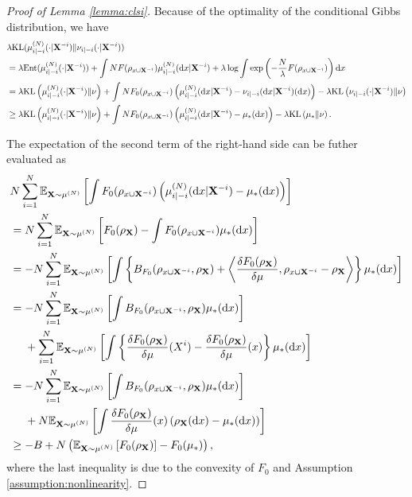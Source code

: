 \begin{proof}[Proof of Lemma \ref{lemma:clsi}]
    Because of the optimality of the conditional Gibbs distribution, we have 
    \begin{align}
        &\lambda\KL( \pow[\mu,N]_{i|-i}(\cdot|\vX^{-i}) \| \nu_{i|-i}(\cdot|\vX^{-i})) \notag\\
        &=\lambda \Ent(\pow[\mu,N]_{i|-i}(\cdot|\vX^{-i}))
        + \int NF(\rho_{x \cup \vX^{-i}}) \pow[\mu,N]_{i|-i}(\rd x|\vX^{-i})
        + \lambda \log \int \exp\left(-\frac{N}{\lambda}F(\rho_{x\cup \vX^{-i}})\right) \rd x \notag \\
        &=\lambda \KL\left(\pow[\mu,N]_{i|-i}(\cdot|\vX^{-i} )\| \nu \right)
        + \int NF_0(\rho_{x \cup \vX^{-i}}) \left(\pow[\mu,N]_{i|-i}(\rd x|\vX^{-i})
        - \nu_{i|-i}(\rd x|\vX^{-i})(\rd x)\right)  - \lambda \KL\left(\nu_{i|-i}(\cdot|\vX^{-i}) \| \nu\right) \notag \\
        &\geq \lambda \KL\left(\pow[\mu,N]_{i|-i}(\cdot|\vX^{-i} )\| \nu \right)
        + \int NF_0(\rho_{x \cup \vX^{-i}}) \left(\pow[\mu,N]_{i|-i}(\rd x|\vX^{-i})
        - \mu_*(\rd x)\right)  - \lambda \KL\left(\mu_* \| \nu\right). \label{eq:fisher_div_eval2}
    \end{align}

    The expectation of the second term of the right-hand side can be futher evaluated as 
    \begin{align}
        &N \sum_{i=1}^N \bE_{\vX \sim \pow[\mu,N]} \left[ \int F_0(\rho_{x \cup \vX^{-i}}) \left(\pow[\mu,N]_{i|-i}(\rd x|\vX^{-i})- \mu_*(\rd x)\right) \right] \notag \\
        &= N \sum_{i=1}^N \bE_{\vX \sim \pow[\mu,N]} \left[ F_0(\rho_\vX) - \int F_0(\rho_{x \cup \vX^{-i}})\mu_*(\rd x) \right] \notag \\
        &= -N \sum_{i=1}^N \bE_{\vX \sim \pow[\mu,N]} \left[\int \left\{ B_{F_0}(\rho_{x \cup \vX^{-i}},\rho_\vX) + \pd< \frac{\delta F_0(\rho_\vX)}{\delta \mu}, \rho_{x \cup \vX^{-i}}-\rho_\vX> \right\} \mu_*(\rd x)\right] \notag \\
        &= -N \sum_{i=1}^N \bE_{\vX \sim \pow[\mu,N]} \left[\int B_{F_0}(\rho_{x \cup \vX^{-i}},\rho_\vX) \mu_*(\rd x)\right] \notag \\
        &~~~~ + \sum_{i=1}^N \bE_{\vX \sim \pow[\mu,N]} \left[\int \left\{ \frac{\delta F_0(\rho_\vX)}{\delta \mu}(X^i) - \frac{\delta F_0(\rho_\vX)}{\delta \mu}(x) \right\} \mu_*(\rd x)\right] \notag \\
        &= -N \sum_{i=1}^N \bE_{\vX \sim \pow[\mu,N]} \left[\int B_{F_0}(\rho_{x \cup \vX^{-i}},\rho_\vX) \mu_*(\rd x)\right] \notag \\
        &~~~~ + N \bE_{\vX \sim \pow[\mu,N]} \left[\int \frac{\delta F_0(\rho_\vX)}{\delta \mu}(x) \left(\rho_{\vX}(\rd x) - \mu_*(\rd x)\right) \right] \notag \\
        &\geq - B 
        + N \left(\bE_{\vX \sim \pow[\mu,N]} \left[ F_0(\rho_\vX)\right] - F_0(\mu_*) \right), \label{eq:fisher_div_eval3}
    \end{align}
    where the last inequality is due to the convexity of $F_0$ and Assumption \ref{assumption:nonlinearity}.


\end{proof}
